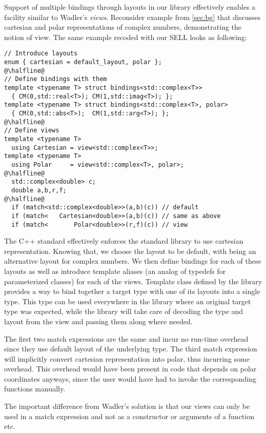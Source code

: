 Support of multiple bindings through layouts in our library effectively enables 
a facility similar to Wadler's \emph{views}\cite{Wadler87}. Reconsider example from 
\textsection\ref{sec:bg} that discusses cartesian and polar representations of 
complex numbers, demonstrating the notion of view. The same example recoded with 
our SELL looks as following:

\begin{lstlisting}[keepspaces,columns=flexible]
// Introduce layouts
enum { cartesian = default_layout, polar };
@\halfline@
// Define bindings with them
template <typename T> struct bindings<std::complex<T>>
  { CM(0,std::real<T>); CM(1,std::imag<T>); };
template <typename T> struct bindings<std::complex<T>, polar>
  { CM(0,std::abs<T>);  CM(1,std::arg<T>); };
@\halfline@
// Define views
template <typename T> 
  using Cartesian = view<std::complex<T>>;
template <typename T> 
  using Polar     = view<std::complex<T>, polar>;
@\halfline@
  std::complex<double> c;
  double a,b,r,f;
@\halfline@
  if (match<std::complex<double>>(a,b)(c)) // default
  if (match<   Cartesian<double>>(a,b)(c)) // same as above
  if (match<       Polar<double>>(r,f)(c)) // view
\end{lstlisting}

\noindent
The C++ standard effectively enforces the standard library to use cartesian 
representation\cite[-4]{C++11}. Knowing that, we choose the 
 layout to be default, with  being an alternative 
layout for complex numbers. We then define bindings for each of these layouts as 
well as introduce template aliases (an analog of typedefs for parameterized 
classes) for each of the views. Template class  defined by the 
library provides a way to bind together a target type with one of its layouts 
into a single type. This type can be used everywhere in the library where an 
original target type was expected, while the library will take care of decoding 
the type and layout from the view and passing them along where needed.

The first two match expressions are the same and incur no run-time overhead 
since they use default layout of the underlying type. The third match expression 
will implicitly convert cartesian representation into polar, thus incurring some 
overhead. This overhead would have been present in code that depends on polar 
coordinates anyways, since the user would have had to invoke the corresponding 
functions manually.

The important difference from Wadler's solution is that our views can only be 
used in a match expression and not as a constructor or arguments of a function 
etc.
